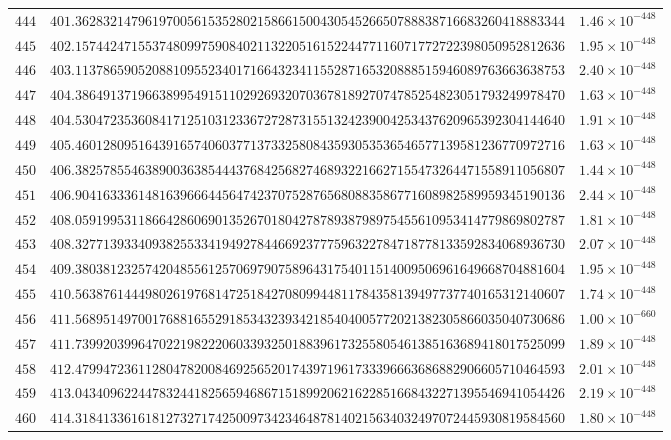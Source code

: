 \documentclass[12pt,reqno]{amsart}
\theoremstyle{remark}
\begin{document}
\begin{longtable}{clc}
$444$ & $401.3628321479619700561535280215866150043054526650788838716683260418883344$ & $1.46\times 10^{-448}$ \\
$445$ & $402.1574424715537480997590840211322051615224477116071772722398050952812636$ & $1.95\times 10^{-448}$ \\
$446$ & $403.1137865905208810955234017166432341155287165320888515946089763663638753$ & $2.40\times 10^{-448}$ \\
$447$ & $404.3864913719663899549151102926932070367818927074785254823051793249978470$ & $1.63\times 10^{-448}$ \\
$448$ & $404.5304723536084171251031233672728731551324239004253437620965392304144640$ & $1.91\times 10^{-448}$ \\
$449$ & $405.4601280951643916574060377137332580843593053536546577139581236770972716$ & $1.63\times 10^{-448}$ \\
$450$ & $406.3825785546389003638544437684256827468932216627155473264471558911056807$ & $1.44\times 10^{-448}$ \\
$451$ & $406.9041633361481639666445647423707528765680883586771608982589959345190136$ & $2.44\times 10^{-448}$ \\
$452$ & $408.0591995311866428606901352670180427878938798975455610953414779869802787$ & $1.81\times 10^{-448}$ \\
$453$ & $408.3277139334093825533419492784466923777596322784718778133592834068936730$ & $2.07\times 10^{-448}$ \\
$454$ & $409.3803812325742048556125706979075896431754011514009506961649668704881604$ & $1.95\times 10^{-448}$ \\
$455$ & $410.5638761444980261976814725184270809944811784358139497737740165312140607$ & $1.74\times 10^{-448}$ \\
$456$ & $411.5689514970017688165529185343239342185404005772021382305866035040730686$ & $1.00\times 10^{-660}$ \\
$457$ & $411.7399203996470221982220603393250188396173255805461385163689418017525099$ & $1.89\times 10^{-448}$ \\
$458$ & $412.4799472361128047820084692565201743971961733396663686882906605710464593$ & $2.01\times 10^{-448}$ \\
$459$ & $413.0434096224478324418256594686715189920621622851668432271395546941054426$ & $2.19\times 10^{-448}$ \\
$460$ & $414.3184133616181273271742500973423464878140215634032497072445930819584560$ & $1.80\times 10^{-448}$ \\

\end{longtable}
\end{document}
